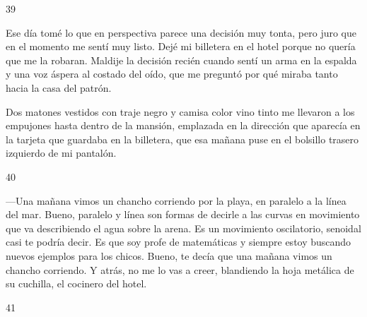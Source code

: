 \documentclass[12pt,twoside,openright,a5paper]{book}
\begin{document}
\vspace{0.5cm}

\hrulefill \hspace{0.1cm}\decofourleft\hspace{0.2cm} 39 \hspace{0.2cm}\decofourright \hspace{0.1cm}\hrulefill

\nopagebreak

\vspace{0.5cm}

\nopagebreak

Ese día tomé lo que en perspectiva parece una decisión muy tonta, pero
juro que en el momento me sentí muy listo. Dejé mi billetera en el hotel
porque no quería que me la robaran. Maldije la decisión recién
cuando sentí un arma en la espalda y una voz áspera
al costado del oído, que me preguntó por qué miraba tanto hacia la casa del
patrón.

Dos matones vestidos con traje negro y camisa color vino tinto
me llevaron a los empujones hasta dentro de la mansión,
emplazada en la dirección que aparecía en la tarjeta que guardaba 
en la billetera, que esa mañana
puse en el bolsillo trasero izquierdo de mi pantalón.


\vspace{0.5cm}

\hrulefill \hspace{0.1cm}\decofourleft\hspace{0.2cm} 40 \hspace{0.2cm}\decofourright \hspace{0.1cm}\hrulefill

\nopagebreak

\vspace{0.5cm}

\nopagebreak

---Una mañana vimos un chancho corriendo por la playa, en paralelo a la línea del
mar. Bueno, paralelo y línea son formas de decirle a las curvas en movimiento
que va describiendo el agua sobre la arena. Es un movimiento oscilatorio,
senoidal casi te podría decir. Es que soy profe de matemáticas y siempre
estoy buscando nuevos ejemplos para los chicos. Bueno, te decía que una
mañana vimos un chancho corriendo. Y atrás, no me lo vas a creer,
blandiendo la hoja metálica de su cuchilla, el cocinero del hotel.

\vspace{0.5cm}
\afterpage{}
\hrulefill \hspace{0.1cm}\decofourleft\hspace{0.2cm} 41 \hspace{0.2cm}\decofourright \hspace{0.1cm}\hrulefill
\end{document}
